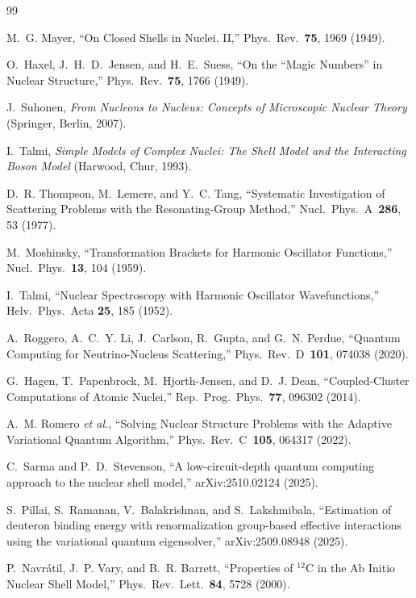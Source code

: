 \documentclass[twocolumn,prc,amsmath,amssymb,superscriptaddress]{revtex4-2}
\begin{document}
\begin{thebibliography}{99}

M.~G. Mayer,
``On Closed Shells in Nuclei. II,''
Phys.~Rev.~\textbf{75}, 1969 (1949).

O.~Haxel, J.~H.~D.~Jensen, and H.~E.~Suess,
``On the ``Magic Numbers'' in Nuclear Structure,''
Phys.~Rev.~\textbf{75}, 1766 (1949).

J.~Suhonen,
\emph{From Nucleons to Nucleus: Concepts of Microscopic Nuclear Theory}
(Springer, Berlin, 2007).

I.~Talmi,
\emph{Simple Models of Complex Nuclei: The Shell Model and the
Interacting Boson Model}
(Harwood, Chur, 1993).

D.~R. Thompson, M.~Lemere, and Y.~C. Tang,
``Systematic Investigation of Scattering Problems with the
Resonating-Group Method,''
Nucl.~Phys.~A~\textbf{286}, 53 (1977).

M.~Moshinsky,
``Transformation Brackets for Harmonic Oscillator Functions,''
Nucl.~Phys.~\textbf{13}, 104 (1959).

I.~Talmi,
``Nuclear Spectroscopy with Harmonic Oscillator Wavefunctions,''
Helv.~Phys.~Acta \textbf{25}, 185 (1952).

A.~Roggero, A.~C.~Y. Li, J.~Carlson, R.~Gupta, and G.~N. Perdue,
``Quantum Computing for Neutrino-Nucleus Scattering,''
Phys.~Rev.~D~\textbf{101}, 074038 (2020).

G.~Hagen, T.~Papenbrock, M.~Hjorth-Jensen, and D.~J. Dean,
``Coupled-Cluster Computations of Atomic Nuclei,''
Rep.~Prog.~Phys.~\textbf{77}, 096302 (2014).

A.~M. Romero \emph{et al.},
``Solving Nuclear Structure Problems with the Adaptive Variational
Quantum Algorithm,''
Phys.~Rev.~C~\textbf{105}, 064317 (2022).

C.~Sarma and P.~D.~Stevenson,
``A low-circuit-depth quantum computing approach to the nuclear
shell model,''
arXiv:2510.02124 (2025).

S.~Pillai, S.~Ramanan, V.~Balakrishnan, and S.~Lakshmibala,
``Estimation of deuteron binding energy with renormalization
group-based effective interactions using the variational quantum
eigensolver,''
arXiv:2509.08948 (2025).

P.~Navr\'atil, J.~P. Vary, and B.~R. Barrett,
``Properties of $^{12}$C in the Ab Initio Nuclear Shell Model,''
Phys.~Rev.~Lett.~\textbf{84}, 5728 (2000).


\end{thebibliography}
\end{document}
